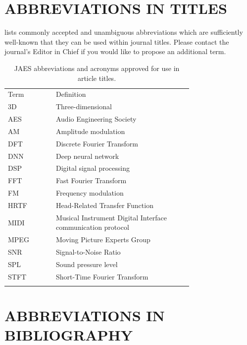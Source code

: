 \documentclass[fleqn,draft]{jaes}
\begin{document}
\section{\MakeUppercase{Abbreviations in titles}}\label{sec:titleabbreviations}

 lists commonly accepted and unambiguous abbreviations which are sufficiently well-known that they can be used within journal titles. Please contact the journal's Editor in Chief if you would like to propose an additional term. 

\begin{table}[!ht]
    \caption{JAES abbreviations and acronyms approved for use in article titles.}\label{table:titleabbreviations}
    \begin{tabular}{@{}lp{0.74\linewidth}}
    \toprule
        Term & Definition \\
    \colrule
        3D & Three-dimensional \\
        AES & Audio Engineering Society \\
        AM & Amplitude modulation \\
        DFT & Discrete Fourier Transform \\
        DNN & Deep neural network \\
        DSP & Digital signal processing \\
        FFT & Fast Fourier Transform \\
        FM & Frequency modulation \\
        HRTF & Head-Related Transfer Function \\
        MIDI & Musical Instrument Digital Interface communication protocol \\
        MPEG & Moving Picture Experts Group \\
        SNR & Signal-to-Noise Ratio \\
        SPL & Sound pressure level \\
        STFT & Short-Time Fourier Transform \\
    \botrule
    \end{tabular}
\end{table}

\section{\MakeUppercase{Abbreviations in bibliography}}\label{sec:biblioabbreviations} 
\end{document}
